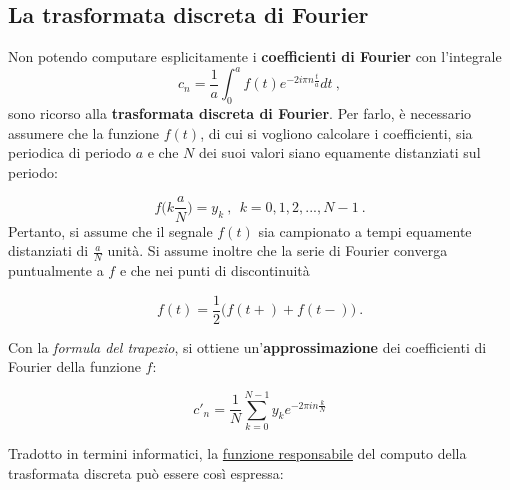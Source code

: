 \documentclass[
]{book}
\begin{document}
\hypertarget{dft}{%
\subsection{La trasformata discreta di Fourier}\label{dft}}

Non potendo computare esplicitamente i \textbf{coefficienti di Fourier} con l'integrale
\[ c_n=\frac{1}{a} \int_{0}^{a}f(t)e^{-2 i \pi n \textstyle \frac {t}{a}}dt \ , \]
sono ricorso alla \textbf{trasformata discreta di Fourier}.
Per farlo, è necessario assumere che la funzione \(f(t)\), di cui si vogliono calcolare i coefficienti, sia periodica di periodo \(a\) e che \(N\) dei suoi valori siano equamente distanziati sul periodo:

\[f \bigg( k\frac{a}{N} \bigg)=y_{k} \ , \ \ k=0,1,2,..., N-1 \ .\]
Pertanto, si assume che il segnale \(f(t)\) sia campionato a tempi equamente distanziati di \(\frac{a}{N}\) unità.
Si assume inoltre che la serie di Fourier converga puntualmente a \(f\) e che nei punti di discontinuità

\[f(t)=\frac{1}{2}\big(f(t+)+f(t-)\big) \ .\]

Con la \emph{formula del trapezio}, si ottiene un'\textbf{approssimazione} dei coefficienti di Fourier della funzione \(f\):

\begin{equation}
    c'_n=\frac{1}{N}\sum_{k=0}^{N-1}y_{k}e^{-2\pi in\frac{k}{N}}
    \label{eq:dcoeff}
\end{equation}

Tradotto in termini informatici, la \href{}{funzione responsabile} del computo della trasformata discreta può essere così espressa:
\end{document}
